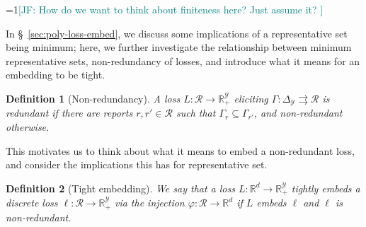 \documentclass[11pt]{article}
\newcommand{\Comments}{1}
\newcommand{\mynote}[2]{\ifnum\Comments=1\textcolor{#1}{#2}\fi}
\newcommand{\jessie}[1]{\mynote{teal}{[JF: #1]}}
\newcommand{\reals}{\mathbb{R}}
\newcommand{\prop}[1]{\mathrm{prop}[#1]}
\newcommand{\simplex}{\Delta_\Y}
\newcommand{\R}{\mathcal{R}}
\newcommand{\Sc}{\mathcal{S}}
\newcommand{\Y}{\mathcal{Y}}
\newcommand{\inprod}[2]{\langle #1, #2 \rangle}%
\newcommand{\toto}{\rightrightarrows}
\newcommand{\trim}{\mathrm{trim}}
\newtheorem{definition}{Definition}
\begin{document}


\jessie{How do we want to think about finiteness here? Just assume it? }

In \S~\ref{sec:poly-loss-embed}, we discuss some implications of a representative set being minimum; here, we further investigate the relationship between minimum representative sets, non-redundancy of losses, and introduce what it means for an embedding to be tight.

\begin{definition}[Non-redundancy]\label{def:nonredundant}
  A loss $L : \R \to \reals^\Y_+$ eliciting $\Gamma:\simplex \toto \R$ is \emph{redundant} if there are reports $r, r' \in \R$ such that $\Gamma_r \subseteq \Gamma_{r'}$, and \emph{non-redundant} otherwise.
\end{definition}

This motivates us to think about what it means to embed a non-redundant loss, and consider the implications this has for representative set.

\begin{definition}[Tight embedding]\label{def:tight-embedding}
  We say that a loss $L : \reals^d \to \reals_+^\Y$ \emph{tightly embeds} a discrete loss $\ell : \R \to \reals_+^\Y$ via the injection $\varphi :\R \to \reals^d$ if $L$ embeds $\ell$ and $\ell$ is non-redundant.
\end{definition}

\end{document}
